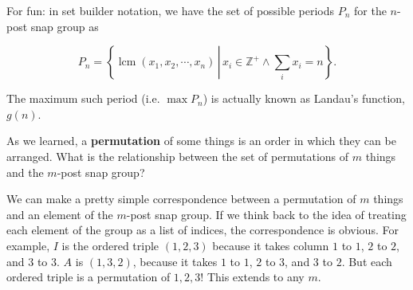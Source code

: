 \documentclass[../gatm_answers.tex]{subfiles}
\begin{document}
For fun: in set builder notation, we have the set of possible periods $P_n$ for the $n$-post snap group as

$$P_n=\left\{\operatorname{lcm} (x_1, x_2, \cdots, x_n)\, \left|\,x_i\in\mathbb{Z}^+ \land \sum_i x_i=n\right.\right\}.$$

The maximum such period (i.e. $\max P_n$) is actually known as Landau's function, $g(n)$.

\begin{outer_problem}
	\item As we learned, a \textbf{permutation} of some things is an order in which they can be arranged. What is the relationship between the set of permutations of $m$ things and the $m$-post snap group?
\end{outer_problem}

We can make a pretty simple correspondence between a permutation of $m$ things and an element of the $m$-post snap group. If we think back to the idea of treating each element of the group as a list of indices, the correspondence is obvious. For example, $I$ is the ordered triple $(1,2,3)$ because it takes column $1$ to $1$, $2$ to $2$, and $3$ to $3$. $A$ is $(1,3,2)$, because it takes $1$ to $1$, $2$ to $3$, and $3$ to $2$. But each ordered triple is a permutation of ${1,2,3}$! This extends to any $m$.
\end{document}
